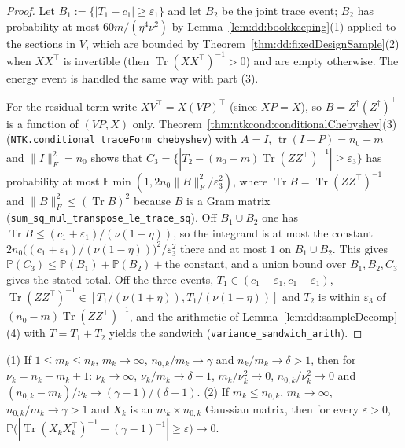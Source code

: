 \begin{proof}
  \leanok
Let $B_1:=\{|T_1-c_1|\ge\varepsilon_1\}$ and let $B_2$ be the joint trace event; $B_2$ has probability at most $60m/(\eta^4\nu^2)$ by Lemma~\ref{lem:dd:bookkeeping}(1) applied to the sections in $V$, which are bounded by Theorem~\ref{thm:dd:fixedDesignSample}(2) when $XX^\top$ is invertible
(then $\operatorname{Tr}(XX^\top)^{-1}>0$) and are empty otherwise. The energy event is handled the same way with part (3).

For the residual term write $X V^\top=X(VP)^\top$ (since $XP=X$), so $B=Z^\dagger(Z^\dagger)^\top$ is a function of $(VP,X)$ only. Theorem~\ref{thm:ntkcond:conditionalChebyshev}(3) (\texttt{NTK.conditional\_traceForm\_chebyshev}) with $A=I$, $\operatorname{tr}(I-P)=n_0-m$ and $\|I\|_F^2=n_0$ shows that
$C_3=\{|T_2-(n_0-m)\operatorname{Tr}(ZZ^\top)^{-1}|\ge\varepsilon_3\}$ has probability at most $\mathbb E\min(1,2n_0\|B\|_F^2/\varepsilon_3^2)$, where $\operatorname{Tr}B=\operatorname{Tr}(ZZ^\top)^{-1}$ and $\|B\|_F^2\le(\operatorname{Tr}B)^2$ because $B$ is a Gram matrix
(\texttt{sum\_sq\_mul\_transpose\_le\_trace\_sq}). Off $B_1\cup B_2$ one has $\operatorname{Tr}B\le(c_1+\varepsilon_1)/(\nu(1-\eta))$, so the integrand is at most the constant $2n_0\bigl((c_1+\varepsilon_1)/(\nu(1-\eta))\bigr)^2/\varepsilon_3^2$ there and at most $1$ on $B_1\cup B_2$. This gives
$\mathbb P(C_3)\le\mathbb P(B_1)+\mathbb P(B_2)+{}$the constant, and a union bound over $B_1,B_2,C_3$ gives the stated total. Off the three events, $T_1\in(c_1-\varepsilon_1,c_1+\varepsilon_1)$, $\operatorname{Tr}(ZZ^\top)^{-1}\in[T_1/(\nu(1+\eta)),T_1/(\nu(1-\eta))]$ and $T_2$ is within $\varepsilon_3$ of $(n_0-m)\operatorname{Tr}(ZZ^\top)^{-1}$,
and the arithmetic of Lemma~\ref{lem:dd:sampleDecomp}(4) with $T=T_1+T_2$ yields the sandwich (\texttt{variance\_sandwich\_arith}).
\end{proof}

\begin{theorem}\label{thm:dd:sampleRatios}
  \leanok
(1) If $1\le m_k\le n_k$, $m_k\to\infty$, $n_{0,k}/m_k\to\gamma$ and $n_k/m_k\to\delta>1$, then for $\nu_k=n_k-m_k+1$: $\nu_k\to\infty$, $\nu_k/m_k\to\delta-1$, $m_k/\nu_k^2\to0$, $n_{0,k}/\nu_k^2\to0$ and $(n_{0,k}-m_k)/\nu_k\to(\gamma-1)/(\delta-1)$.
(2) If $m_k\le n_{0,k}$, $m_k\to\infty$, $n_{0,k}/m_k\to\gamma>1$ and $X_k$ is an $m_k\times n_{0,k}$ Gaussian matrix, then for every $\varepsilon>0$, $\mathbb P\bigl(|\operatorname{Tr}(X_kX_k^\top)^{-1}-(\gamma-1)^{-1}|\ge\varepsilon\bigr)\to0$.
\end{theorem}

